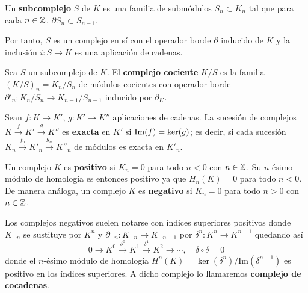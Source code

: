 \begin{definicion}
	Un \textbf{subcomplejo} $S$ de $K$ es una familia de submódulos $S_n \subset K_n$ tal que para cada $n \in \mathbb{Z}$, $\partial S_n \subset S_{n-1}$.
\end{definicion}

Por tanto, $S$ es un complejo en sí con el operador borde $\partial$ inducido de $K$ y la inclusión $i: S \rightarrow K$ es una aplicación de cadenas.

\begin{definicion}
	Sea $S$ un subcomplejo de $K$. El \textbf{complejo cociente} $K/S$ es la familia $(K/S)_n = K_n/S_n$ de módulos cocientes con operador borde $\partial'_n: K_n/S_n \rightarrow K_{n-1}/S_{n-1}$ inducido por $\partial_K$.
\end{definicion}

%

\begin{definicion}
Sean \( f: K \rightarrow K' \), \( g: K' \rightarrow K'' \) aplicaciones de cadenas. La sucesión de complejos \( K \xrightarrow{f} K' \xrightarrow{g} K'' \) es \textbf{exacta} en \( K' \) si \( \operatorname{Im}(f) = \ker(g) \); es decir, si cada sucesión \( K_n \xrightarrow{f_n} K'_n \xrightarrow{g_n} K''_n \) de módulos es exacta en \( K'_n \).
\end{definicion}


\begin{definicion}
Un complejo \( K \) es \textbf{positivo} si \( K_n = 0 \) para todo \( n < 0 \) con $n \in \mathbb{Z}$. Su $n$-ésimo módulo de homología es entonces positivo  ya que \( H_n(K) = 0 \) para todo \( n < 0 \). De manera análoga, un complejo \( K \) es \textbf{negativo} si \( K_n = 0 \) para todo \( n > 0 \) con $n \in \mathbb{Z}$.
\end{definicion}

Los complejos negativos suelen notarse con índices superiores positivos donde $K_{-n}$ se sustituye por $K^n$ y $\partial_{-n} : K_{-n} \rightarrow K_{-n-1}$ por $\delta^n: K^n \rightarrow K^{n+1}$ quedando así
\[ 0 \to K^0 \xrightarrow{\delta^0} K^1 \xrightarrow{\delta^1} K^2 \to \cdots, \quad \delta \circ \delta = 0 \]
donde el $n$-ésimo módulo de homología \( H^n(K) = \ker(\delta^n)/\text{Im}(\delta^{n-1}) \) es positivo en los índices superiores. A dicho complejo lo llamaremos \textbf{complejo de cocadenas}.

